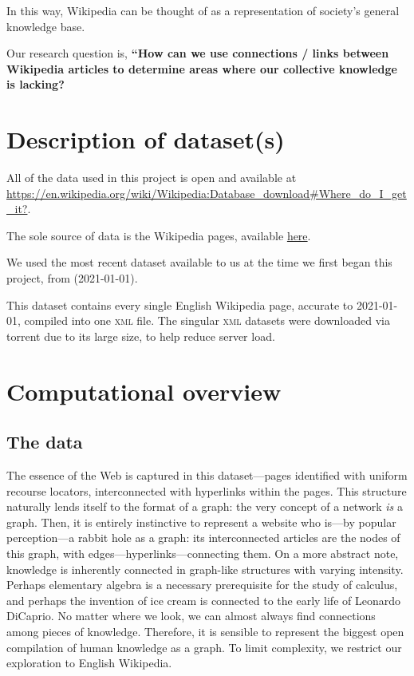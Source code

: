\documentclass[fontsize=12pt]{article}
\begin{document}
\begin{multicols}{2}
    In this way, Wikipedia can be thought of as a representation of society's general knowledge base.
    
    Our research question is, \textbf{``How can we use connections / links between Wikipedia articles to determine areas where our collective knowledge is lacking?}
    
    \section{Description of dataset(s)}
    All of the data used in this project is open and available at \href{https://en.wikipedia.org/wiki/Wikipedia:Database\_download\#Where\_do\_I\_get\_it?}{https://en.wikipedia.org/wiki/Wikipedia:Database\_download\#Where\_do\_I\_get\_it?}. \parencite{WikimediaDownloads}
    
    The sole source of data is the Wikipedia pages, available \href{https://meta.wikimedia.org/wiki/Data\_dump\_torrents\#English\_Wikipedia}{here}. \parencite{DataDumpTorrents}
    
    We used the most recent dataset available to us at the time we first began this project, from (2021-01-01).
    
    This dataset contains every single English Wikipedia page, accurate to 2021-01-01, compiled into one \textsc{xml} file. The singular \textsc{xml} datasets were downloaded via torrent due to its large size, to help reduce server load.
    
    \section{Computational overview}
    \subsection{The data}
    The essence of the Web is captured in this dataset---pages identified with uniform recourse locators, interconnected with hyperlinks within the pages. This structure naturally lends itself to the format of a graph: the very concept of a network \emph{is} a graph. Then, it is entirely instinctive to represent a website who is---by popular perception---a rabbit hole as a graph: its interconnected articles are the nodes of this graph, with edges---hyperlinks---connecting them. 
    On a more abstract note, knowledge is inherently connected in graph-like structures with varying intensity. Perhaps elementary algebra is a necessary prerequisite for the study of calculus, and perhaps the invention of ice cream is connected to the early life of Leonardo DiCaprio. No matter where we look, we can almost always find connections among pieces of knowledge.
    Therefore, it is sensible to represent the biggest open compilation of human knowledge as a graph. To limit complexity, we restrict our exploration to English Wikipedia. 


\end{multicols}
\end{document}
